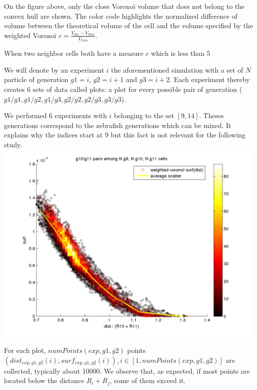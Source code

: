 On the figure above, only the close Voronoï volume that does not belong to the convex hull are shown. The color code highlights the normalized difference of volume between the theoretical volume of the cell and the volume specified by the weighted Voronoï $c = \frac{V_{obs} - V_{theo}}{V_{theo}}$. 

When two neighbor cells both have a measure $c$ which is less than 5%

We will denote by an experiment $i$ the aforementioned simulation with a set of $N$ particle of generation $g1=i$, $g2=i+1$ and $g3=i+2$. Each experiment thereby creates 6 sets of data called plots: a plot for every possible pair of generation ($g1/g1, g1/g2, g1/g3, g2/g2, g2/g3, g3/g3$).

We performed 6 experiments with $i$ belonging to the set $\left [ 9, 14 \right ]$. Theses generations correspond to the zebrafish generations which can be mixed. It explains why the indices start at 9 but this fact is not relevant for the following study. 
\includegraphics{../../images/MECAGEN/spatial_neighb/g10_g11_exp9_simple.png}

For each plot, $numPoints(exp,g1,g2)$ points $\left ( dist_{exp,g1,g2}(i), surf_{exp,g1,g2}(i)  \right ), i \in \left [ 1,numPoints(exp,g1,g2) \right ]$ are collected, typically about 10000. We observe that, as expected, if most points are located below the distance $R_i+R_j$, some of them exceed it.

